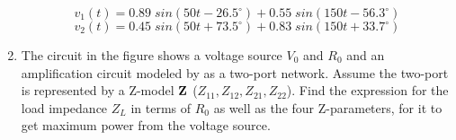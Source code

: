 \begin{enumerate}
\[ v_1(t)=0.89\; sin(50 t-26.5^\circ)+0.55\;sin(150 t-56.3^\circ) \]
\[ v_2(t)=0.45\; sin(50 t+73.5^\circ)+0.83\;sin(150 t+33.7^\circ) \]


\item The circuit in the figure shows a voltage source $V_0$ and $R_0$ and an
amplification circuit modeled by as a two-port network. Assume the two-port is
represented by a Z-model ${\bf Z}$ ($Z_{11}, Z_{12}, Z_{21}, Z_{22}$). Find 
the expression for the load impedance $Z_L$ in terms of $R_0$ as well as the
four Z-parameters, for it to get maximum power from the voltage source.

\end{enumerate}



